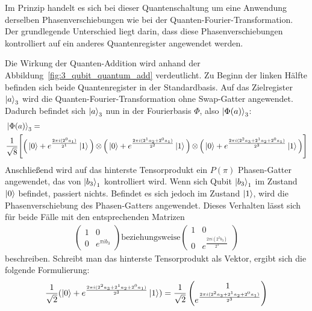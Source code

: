 Im Prinzip handelt es sich bei dieser Quantenschaltung um eine Anwendung derselben Phasenverschiebungen 
wie bei der Quanten-Fourier-Transformation. 
Der grundlegende Unterschied liegt darin, 
dass diese Phasenverschiebungen kontrolliert auf ein anderes Quantenregister angewendet werden.

Die Wirkung der Quanten-Addition wird anhand der Abbildung~\ref{fig:3_qubit_quantum_add} verdeutlicht.
Zu Beginn der linken Hälfte befinden sich beide Quantenregister in der Standardbasis.
Auf das Zielregister \(\ket{a}_3\) wird die Quanten-Fourier-Transformation ohne Swap-Gatter angewendet.
Dadurch befindet sich \(\ket{a}_3\) nun in der Fourierbasis \(\Phi\), also \(\ket{\Phi(a)}_3\):
\begin{align*}
  \begin{aligned}
  &\ket{\Phi(a)}_3 =\\
  &\frac{1}{\sqrt{8}} \Bigg[ \Big(\ket{0} + { e^{\frac{2 \pi i (2^0a_1)}{2^1}}}\ket{1} \Big) \operatorname{\otimes}
  \Big(\ket{0} + { e^{\frac{2 \pi i (2^1a_2+2^0a_1)}{2^2}}}\ket{1} \Big) \operatorname{\otimes}
  \Big(\ket{0} + { e^{\frac{2 \pi i (2^{2}a_3 +2^1a_2+2^0a_1)}{2^3}}}\ket{1} \Big) \Bigg]
  \end{aligned}
\end{align*}
Anschließend wird auf das hinterste Tensorprodukt ein \(P(\pi)\) Phasen-Gatter angewendet,
das von \(\ket{b_3}_1\) kontrolliert wird.
Wenn sich Qubit \(\ket{b_3}_1\) im Zustand \(\ket{0}\) befindet, passiert nichts.
Befindet es sich jedoch im Zustand \(\ket{1}\), wird die Phasenverschiebung des Phasen-Gatters angewendet.
Dieses Verhalten lässt sich für beide Fälle mit den entsprechenden Matrizen
\begin{align*}
  \begin{pmatrix}
    1 & 0 \\
    0 & e^{\pi i b_3}
  \end{pmatrix}  
  \text{beziehungsweise}  
  \begin{pmatrix}
    1 & 0 \\
    0 & e^{\frac{2\pi i (2^2b_3)}{2^3}}
  \end{pmatrix}
\end{align*}
beschreiben.
Schreibt man das hinterste Tensorprodukt als Vektor, ergibt sich die folgende Formulierung:
\[\frac{1}{\sqrt{2}}( \ket{0} + { e^{\frac{2 \pi i (2^{2}a_3 +2^1a_2+2^0a_1)}{2^3}}}\ket{1}) =
\frac{1}{\sqrt{2}}
\begin{pmatrix}
     1  \\
     e^{\frac{2 \pi i (2^{2}a_3 +2^1a_2+2^0a_1)}{2^3}}
  \end{pmatrix}
    \]
